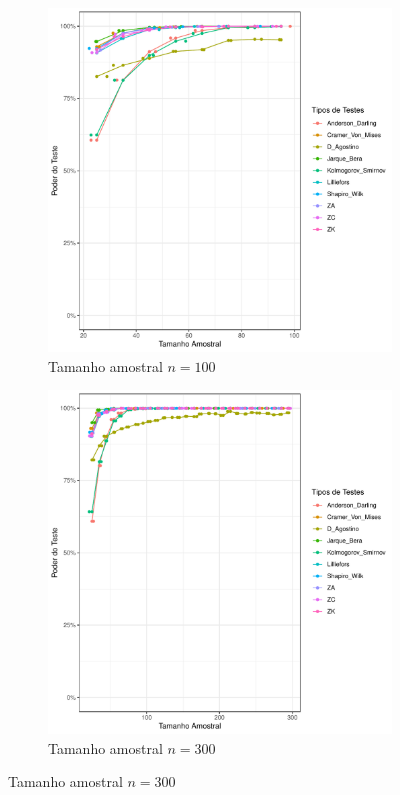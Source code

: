 \documentclass[a4paper,11pt]{article} %
\begin{document}
\begin{figure}[H]
    \vspace{0.5cm} %
    \begin{subfigure}[b]{0.45\textwidth}
        \centering
        \includegraphics[width=\textwidth]{Distribuição Cauchy/Poder do Teste/poder_teste_cauchy_100.pdf}
        \caption{Tamanho amostral \(n = 100\)}
        \label{fig:cauchy_poder_100}
    \end{subfigure}
    \hfill
    \begin{subfigure}[b]{0.45\textwidth}
        \centering
        \includegraphics[width=\textwidth]{Distribuição Cauchy/Poder do Teste/poder_teste_cauchy_300.pdf}
        \caption{Tamanho amostral \(n = 300\)}
        \label{fig:cauchy_poder_300}
    \end{subfigure}
    

\end{figure}
\end{document}
